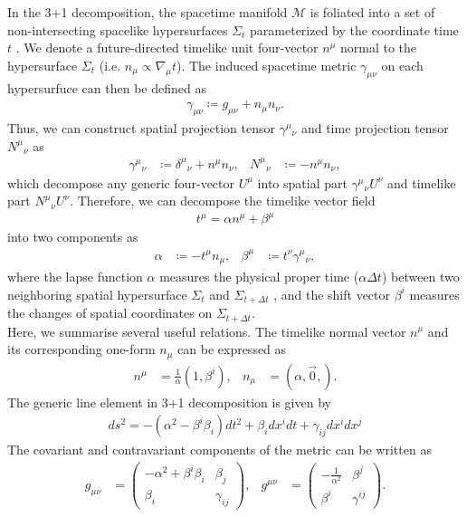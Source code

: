 In the 3+1 decomposition, the spacetime manifold $\mathcal{M}$ is foliated into a set of non-intersecting spacelike hypersurfaces $\Sigma_t$ parameterized by the coordinate time $t$ \cite{misner1973gravitation}.
We denote a future-directed timelike unit four-vector $n^\mu$ normal to the hypersurface $\Sigma_t$ (i.e. $n_{\mu} \propto \nabla_\mu t$).
The induced spacetime metric $\gamma_{\mu\nu}$ on each hypersurfuce can then be defined as
\begin{align}\label{eq:1.2.spatial}
    \gamma_{\mu\nu} \coloneqq g_{\mu\nu} + n_{\mu} n_{\nu}.
\end{align}
Thus, we can construct spatial projection tensor $\gamma^{\mu}{}_{\nu}$ and time projection tensor $N^{\mu}{}_{\nu}$ as
\begin{align}
    \gamma^{\mu}{}_{\nu} &\coloneqq \delta^{\mu}{}_{\nu} + n^{\mu} n_{\nu}, & N^{\mu}{}_{\nu} &\coloneqq - n^{\mu} n_{\nu},
\end{align}
which decompose any generic four-vector $U^\mu$ into spatial part $\gamma^{\mu}{}_{\nu}U^{\nu}$ and timelike part $N^{\mu}{}_{\nu}U^{\nu}$.
Therefore, we can decompose the timelike vector field
\begin{align}\label{eq:1.2.1.normal_decompose}
t^\mu = \alpha n^{\mu} + \beta^{\mu}
\end{align}
into two components as
\begin{align}
    \alpha &\coloneqq - t^\mu n_\mu, & \beta^{\mu} &\coloneqq t^{\nu} \gamma^{\mu}{}_{\nu},
\end{align}
where the lapse function $\alpha$ measures the physical proper time ($\alpha\Delta t$) between two neighboring spatial hypersurface $\Sigma_t$ and $\Sigma_{t+\Delta t}$
, and the shift vector $\beta^i$ measures the changes of spatial coordinates on $\Sigma_{t+\Delta t}$.\\
Here, we summarise several useful relations.
The timelike normal vector $n^\mu$ and its corresponding one-form $n_\mu$ can be expressed as
\begin{align} \label{eq:1.2.1.normal}
    n^\mu &= \frac{1}{\alpha}\left(1, \beta^i \right), & n_\mu &= \left(\alpha, \vec{0}, \right).
\end{align}
The generic line element in 3+1 decomposition is given by
\begin{align}
    ds^2 = - \left( \alpha^2 - \beta^i \beta_i \right) dt^2 + \beta_i dx^i dt + \gamma_{ij} dx^i dx^j
\end{align}
The covariant and contravariant components of the metric can be written as
\begin{align}\label{eq:1.2.1.g}
    g_{\mu\nu} &= 
    \begin{pmatrix}
        - \alpha^2 + \beta^i \beta_i & \beta_j \\
        \beta_i & \gamma_{ij}
    \end{pmatrix}, &
    g^{\mu\nu} &= 
    \begin{pmatrix}
        - \frac{1}{\alpha^2} & \beta^j \\
        \beta^i & \gamma^{ij}
    \end{pmatrix}.
\end{align}
